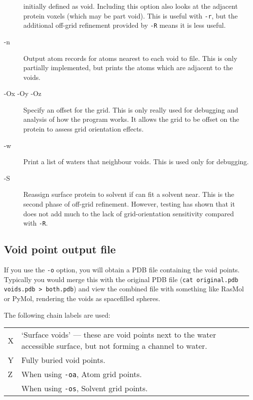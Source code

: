 \documentclass{article}
\begin{document}
\begin{description}
  initially defined as void. Including this option also looks at the
  adjacent protein voxels (which may be part void). This is useful
  with \verb|-r|, but the additional off-grid refinement provided by \verb|-R| means
  it is less useful.
\item[-n] Output atom records for atoms nearest to each void to
  file. This is only partially implemented, but prints the atoms which
  are adjacent to the voids.
\item[-Ox -Oy -Oz] Specify an offset for the grid. This is only really
  used for debugging and analysis of how the program works. It allows
  the grid to be offset on the protein to assess grid orientation
  effects. 
\item[-w] Print a list of waters that neighbour voids. This is used
  only for debugging.
\item[-S] Reassign surface protein to solvent if can fit a solvent
  near. This is the second phase of off-grid refinement. However,
  testing has shown that it does not add much to the lack of
  grid-orientation sensitivity compared with \verb|-R|.
\end{description}
\vspace{1em}

\vspace{1em}

\setlength{\fboxrule}{2pt}
\setlength{\fboxsep}{2mm}
\vspace{1em}


\subsection{Void point output file}
\label{sec:voidsfile}

If you use the \verb|-o| option, you will obtain a PDB file containing
the void points. Typically you would merge this with the original PDB
file (\verb|cat original.pdb voids.pdb > both.pdb|) and view the
combined file with something like RasMol or PyMol, rendering the voids
as spacefilled spheres.

The following chain labels are used:
\vspace{1em}

\noindent\begin{tabularx}{\textwidth}{lX}
  X & `Surface voids' --- these are void points next to the water accessible
      surface, but not forming a channel to water. \\
  Y & Fully buried void points. \\
  Z & When using \verb|-oa|, Atom grid points. \\
    & When using \verb|-os|, Solvent grid points. \\
\end{tabularx}
\end{document}
